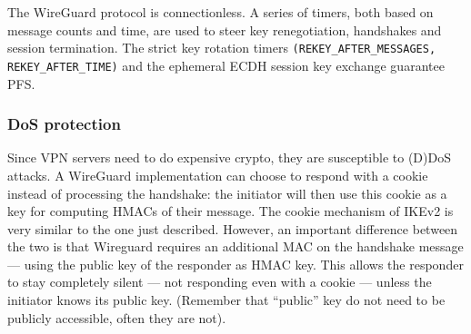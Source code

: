 \documentclass[11pt,oneside,a4paper]{article}
\begin{document}
The WireGuard protocol is connectionless. A series of timers, both based on message counts and time, are used to steer key renegotiation, handshakes and session termination. The strict key rotation timers \texttt{(REKEY\_AFTER\_MESSAGES, REKEY\_AFTER\_TIME)} and the ephemeral
ECDH session key exchange guarantee PFS.

\subsubsection{DoS protection}

Since VPN servers need to do expensive crypto, they are susceptible to (D)DoS attacks. A WireGuard implementation can choose to respond with a cookie instead of processing the handshake: the initiator will then use this cookie as a key for computing HMACs of their message. The cookie mechanism of IKEv2 is very similar to the one just described. However, an important difference between the two is that Wireguard requires an additional MAC on the handshake message — using the public key of the responder as HMAC key. This allows the responder to stay completely silent — not responding even with a cookie — unless the initiator knows its public key. (Remember that “public” key do not need to be publicly accessible, often they are not).






\label{lastpage} %
\clearpage
{}



\clearpage
\appendix
{}
\end{document}
